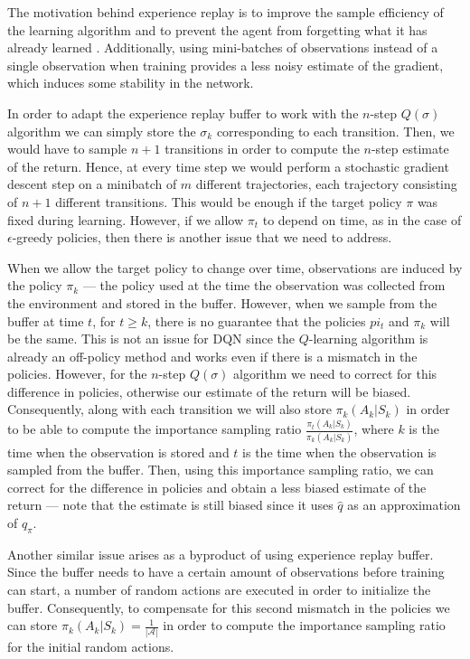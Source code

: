 The motivation behind experience replay is to improve the sample efficiency of the learning algorithm and to prevent the agent from forgetting what it has already learned \parencite{Lin1992}.
Additionally, using mini-batches of observations instead of a single observation when training provides a less noisy estimate of the gradient, which induces some stability in the network.

In order to adapt the experience replay buffer to work with the $n$-step $Q(\sigma)$ algorithm we can simply store the $\sigma_{k}$ corresponding to each transition.
Then, we would have to sample $n+1$ transitions in order to compute the $n$-step estimate of the return.
Hence, at every time step we would perform a stochastic gradient descent step on a minibatch of $m$ different trajectories, each trajectory consisting of $n+1$ different transitions.
This would be enough if the target policy $\pi$ was fixed during learning.
However, if we allow $\pi_t$ to depend on time, as in the case of $\epsilon$-greedy policies, then there is another issue that we need to address.

When we allow the target policy to change over time, observations are induced by the policy $\pi_k$ --- the policy used at the time the observation was collected from the environment and stored in the buffer.
However, when we sample from the buffer at time $t$, for $t \geq k$, there is no guarantee that the policies $pi_t$ and $\pi_k$ will be the same.
This is not an issue for DQN since the $Q$-learning algorithm is already an off-policy method and works even if there is a mismatch in the policies.
However, for the $n$-step $Q(\sigma)$ algorithm we need to correct for this difference in policies, otherwise our estimate of the return will be biased.
Consequently, along with each transition we will also store $\pi_k(A_k|S_k)$ in order to be able to compute the importance sampling ratio $\frac{\pi_t(A_k|S_k)}{\pi_k(A_k|S_k)}$, where $k$ is the time when the observation is stored and $t$ is the time when the observation is sampled from the buffer.
Then, using this importance sampling ratio, we can correct for the difference in policies and obtain a less biased estimate of the return --- note that the estimate is still biased since it uses $\hat{q}$ as an approximation of $q_\pi$.

Another similar issue arises as a byproduct of using experience replay buffer.
Since the buffer needs to have a certain amount of observations before training can start, a number of random actions are executed in order to initialize the buffer.
Consequently, to compensate for this second mismatch in the policies we can store $\pi_k(A_k|S_k) = \frac{1}{|\mathcal{A}|}$ in order to compute the importance sampling ratio for the initial random actions.


